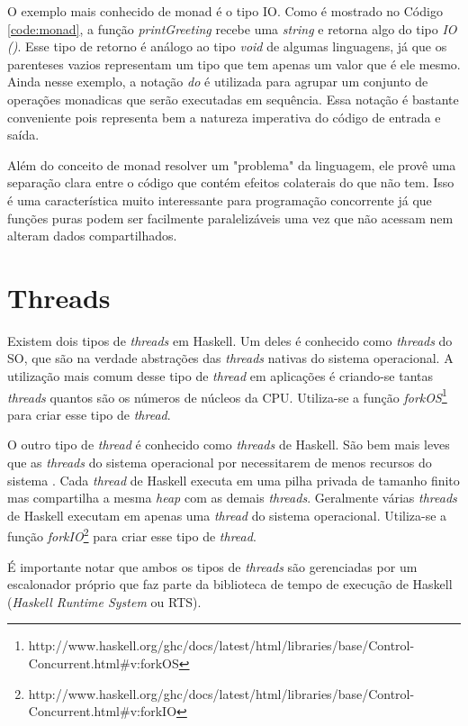 O exemplo mais conhecido de monad é o tipo IO. Como é mostrado no Código \ref{code:monad}, a função \emph{printGreeting} recebe uma \emph{string} e retorna algo do tipo \emph{IO ()}. Esse tipo de retorno é análogo ao tipo \emph{void} de algumas linguagens, já que os parenteses vazios representam um tipo que tem apenas um valor que é ele mesmo. Ainda nesse exemplo, a notação \emph{do} é utilizada para agrupar um conjunto de operações monadicas que serão executadas em sequência. Essa notação é bastante conveniente pois  representa bem a natureza imperativa do código de entrada e saída.

Além do conceito de monad resolver um "problema" da linguagem, ele provê uma separação clara entre o código que contém efeitos colaterais do que não tem. Isso é uma característica muito interessante para programação concorrente já que funções puras podem ser facilmente paralelizáveis uma vez que não acessam nem alteram dados compartilhados.


\section{Threads}

Existem dois tipos de \emph{threads} em Haskell. Um deles é conhecido como \emph{threads} do SO, que são na verdade abstrações das \emph{threads} nativas do sistema operacional. A utilização mais comum desse tipo de \emph{thread} em aplicações é criando-se tantas \emph{threads} quantos são os números de núcleos da CPU. Utiliza-se a função \emph{forkOS}\footnote{http://www.haskell.org/ghc/docs/latest/html/libraries/base/Control-Concurrent.html\#v:forkOS} para criar esse tipo de \emph{thread}.

O outro tipo de \emph{thread} é conhecido como \emph{threads} de Haskell. São bem mais leves que as \emph{threads} do sistema operacional por necessitarem de menos recursos do sistema \cite{marlow2009runtime}. Cada \emph{thread} de Haskell executa em uma pilha privada de tamanho finito mas compartilha a mesma \emph{heap} com as demais \emph{threads}. Geralmente várias \emph{threads} de Haskell executam em apenas uma \emph{thread} do sistema operacional. Utiliza-se a função \emph{forkIO}\footnote{http://www.haskell.org/ghc/docs/latest/html/libraries/base/Control-Concurrent.html\#v:forkIO} para criar esse tipo de \emph{thread}.

É importante notar que ambos os tipos de \emph{threads} são gerenciadas por um escalonador próprio que faz parte da biblioteca de tempo de execução de Haskell (\emph{Haskell Runtime System} ou RTS). 

